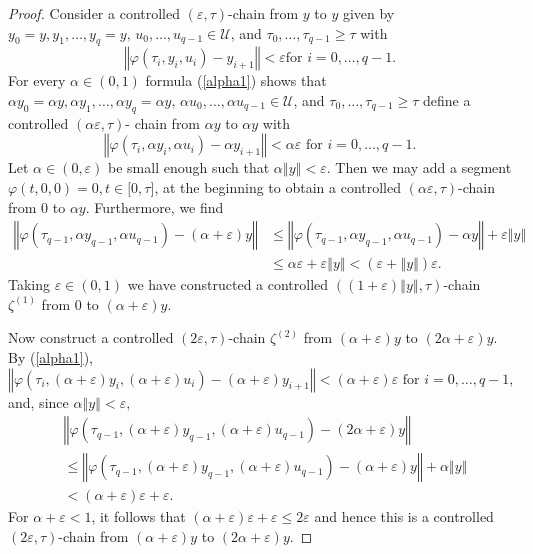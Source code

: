 \documentclass{siamltex}%
\begin{document}
\begin{proof}
Consider a controlled $(\varepsilon,\tau)$-chain from $y$ to $y$ given by
$y_{0}=y,y_{1},\ldots,y_{q}=y,\allowbreak\,u_{0},\ldots,u_{q-1}\in\mathcal{U}%
$, and $\tau_{0},\ldots,\tau_{q-1}\geq\tau$ with%
\[
\left\Vert \varphi(\tau_{i},y_{i},u_{i})-y_{i+1}\right\Vert <\varepsilon\text{
for }i=0,\ldots,q-1.
\]
For every $\alpha\in(0,1)$ formula (\ref{alpha1}) shows that $\alpha
y_{0}=\alpha y,\alpha y_{1},\ldots,\alpha y_{q}=\alpha y,\,\allowbreak\alpha
u_{0},\ldots,\allowbreak\alpha u_{q-1}\in\mathcal{U}$, and $\tau_{0}%
,\ldots,\tau_{q-1}\geq\tau$ define a controlled $(\alpha\varepsilon,\tau)$-
chain from $\alpha y$ to $\alpha y$ with%
\[
\left\Vert \varphi(\tau_{i},\alpha y_{i},\alpha u_{i})-\alpha y_{i+1}%
\right\Vert <\alpha\varepsilon\text{ for }i=0,\ldots,q-1.
\]
Let $\alpha\in(0,\varepsilon)$ be small enough such that $\alpha\left\Vert
y\right\Vert <\varepsilon$. Then we may add a segment $\varphi(t,0,0)=0,t\in
\lbrack0,\tau]$, at the beginning to obtain a controlled $(\alpha
\varepsilon,\tau)$-chain from $0$ to $\alpha y$. Furthermore, we find%
\begin{align*}
\left\Vert \varphi(\tau_{q-1},\alpha y_{q-1},\alpha u_{q-1})-(\alpha
+\varepsilon)y\right\Vert  &  \leq\left\Vert \varphi(\tau_{q-1},\alpha
y_{q-1},\alpha u_{q-1})-\alpha y\right\Vert +\varepsilon\left\Vert
y\right\Vert \\
&  \leq\alpha\varepsilon+\varepsilon\left\Vert y\right\Vert <(\varepsilon
+\left\Vert y\right\Vert )\varepsilon.
\end{align*}
Taking $\varepsilon\in(0,1)$ we have constructed a controlled $((1+\varepsilon
)\left\Vert y\right\Vert ,\tau)$-chain $\zeta^{(1)}$ from $0$ to
$(\alpha+\varepsilon)y$.

Now construct a controlled $(2\varepsilon,\tau)$-chain $\zeta^{(2)}$ from
$(\alpha+\varepsilon)y$ to $(2\alpha+\varepsilon)y$. By (\ref{alpha1}),%
\[
\left\Vert \varphi(\tau_{i},(\alpha+\varepsilon)y_{i},(\alpha+\varepsilon
)u_{i})-(\alpha+\varepsilon)y_{i+1}\right\Vert <(\alpha+\varepsilon
)\varepsilon\text{ for }i=0,\ldots,q-1,
\]
and, since $\alpha\left\Vert y\right\Vert <\varepsilon$,%
\begin{align*}
&  \left\Vert \varphi(\tau_{q-1},(\alpha+\varepsilon)y_{q-1},(\alpha
+\varepsilon)u_{q-1})-(2\alpha+\varepsilon)y\right\Vert \\
&  \leq\left\Vert \varphi(\tau_{q-1},(\alpha+\varepsilon)y_{q-1}%
,(\alpha+\varepsilon)u_{q-1})-(\alpha+\varepsilon)y\right\Vert +\alpha
\left\Vert y\right\Vert \\
&  <(\alpha+\varepsilon)\varepsilon+\varepsilon.
\end{align*}
For $\alpha+\varepsilon<1$, it follows that $(\alpha+\varepsilon
)\varepsilon+\varepsilon\leq2\varepsilon$ and hence this is a controlled
$(2\varepsilon,\tau)$-chain from $(\alpha+\varepsilon)y$ to $(2\alpha
+\varepsilon)y$.


\end{proof}
\end{document}

